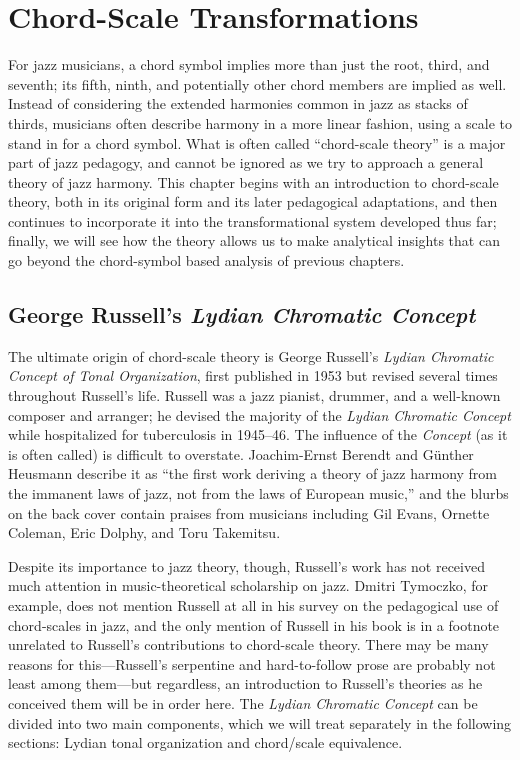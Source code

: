 
\chapter{Chord-Scale Transformations}
\label{chap:chord-scale-transformations}
\addtocspace


For jazz musicians, a chord symbol implies more than just the root, third, and
seventh; its fifth, ninth, and potentially other chord members are implied as
well. Instead of considering the extended harmonies common in jazz as stacks
of thirds, musicians often describe harmony in a more linear fashion, using a
scale to stand in for a chord symbol. What is often called ``chord-scale
theory'' is a major part of jazz pedagogy, and cannot be ignored as we try to
approach a general theory of jazz harmony. This chapter begins with an
introduction to chord-scale theory, both in its original form and its later
pedagogical adaptations, and then continues to incorporate it into the
transformational system developed thus far; finally, we will see how the
theory allows us to make analytical insights that can go beyond the
chord-symbol based analysis of previous chapters.

\section{George Russell’s \emph{Lydian Chromatic Concept}}
\label{sec:lcc}

The ultimate origin of chord-scale theory is George Russell's \emph{Lydian
  Chromatic Concept of Tonal Organization}, first published in 1953 but
revised several times throughout Russell's life. Russell was a jazz
pianist, drummer, and a well-known composer and arranger; he devised the
majority of the \emph{Lydian Chromatic Concept} while hospitalized for
tuberculosis in 1945--46. The influence of the \emph{Concept} (as it
is often called) is difficult to overstate. Joachim-Ernst Berendt and Günther
Heusmann describe it as ``the first work deriving a theory of jazz harmony from
the immanent laws of jazz, not from the laws of European music,'' and the
blurbs on the back cover contain praises from musicians including Gil Evans,
Ornette Coleman, Eric Dolphy, and Toru Takemitsu.

Despite its importance to jazz theory, though, Russell's work has not received
much attention in music-theoretical scholarship on jazz. Dmitri Tymoczko, for
example, does not mention Russell at all in his survey on the pedagogical use
of chord-scales in jazz, and the only mention of Russell in his book is in a
footnote unrelated to Russell's contributions to chord-scale theory.
There may be many reasons for this---Russell's serpentine and hard-to-follow
prose are probably not least among them---but regardless, an introduction
to Russell's theories as he conceived them will be in order here. The
\emph{Lydian Chromatic Concept} can be divided into two main components, which
we will treat separately in the following sections: Lydian tonal organization and
chord/scale equivalence.

